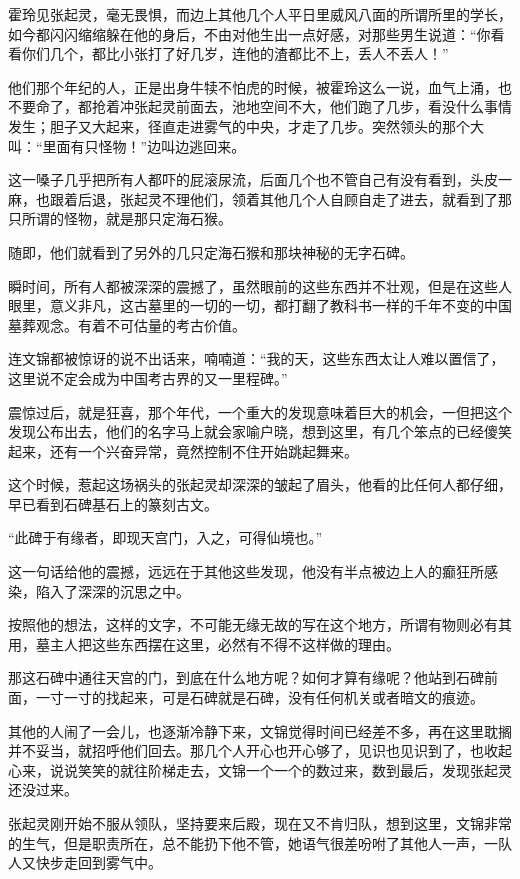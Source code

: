 霍玲见张起灵，毫无畏惧，而边上其他几个人平日里威风八面的所谓所里的学长，如今都闪闪缩缩躲在他的身后，不由对他生出一点好感，对那些男生说道：“你看看你们几个，都比小张打了好几岁，连他的渣都比不上，丢人不丢人！”

他们那个年纪的人，正是出身牛犊不怕虎的时候，被霍玲这么一说，血气上涌，也不要命了，都抢着冲张起灵前面去，池地空间不大，他们跑了几步，看没什么事情发生；胆子又大起来，径直走进雾气的中央，才走了几步。突然领头的那个大叫：“里面有只怪物！”边叫边逃回来。

这一嗓子几乎把所有人都吓的屁滚尿流，后面几个也不管自己有没有看到，头皮一麻，也跟着后退，张起灵不理他们，领着其他几个人自顾自走了进去，就看到了那只所谓的怪物，就是那只定海石猴。

随即，他们就看到了另外的几只定海石猴和那块神秘的无字石碑。

瞬时间，所有人都被深深的震撼了，虽然眼前的这些东西并不壮观，但是在这些人眼里，意义非凡，这古墓里的一切的一切，都打翻了教科书一样的千年不变的中国墓葬观念。有着不可估量的考古价值。

连文锦都被惊讶的说不出话来，喃喃道：“我的天，这些东西太让人难以置信了，这里说不定会成为中国考古界的又一里程碑。”

震惊过后，就是狂喜，那个年代，一个重大的发现意味着巨大的机会，一但把这个发现公布出去，他们的名字马上就会家喻户晓，想到这里，有几个笨点的已经傻笑起来，还有一个兴奋异常，竟然控制不住开始跳起舞来。

这个时候，惹起这场祸头的张起灵却深深的皱起了眉头，他看的比任何人都仔细，早已看到石碑基石上的篆刻古文。

“此碑于有缘者，即现天宫门，入之，可得仙境也。”

这一句话给他的震撼，远远在于其他这些发现，他没有半点被边上人的癫狂所感染，陷入了深深的沉思之中。

按照他的想法，这样的文字，不可能无缘无故的写在这个地方，所谓有物则必有其用，墓主人把这些东西摆在这里，必然有不得不这样做的理由。

那这石碑中通往天宫的门，到底在什么地方呢？如何才算有缘呢？他站到石碑前面，一寸一寸的找起来，可是石碑就是石碑，没有任何机关或者暗文的痕迹。

其他的人闹了一会儿，也逐渐冷静下来，文锦觉得时间已经差不多，再在这里耽搁并不妥当，就招呼他们回去。那几个人开心也开心够了，见识也见识到了，也收起心来，说说笑笑的就往阶梯走去，文锦一个一个的数过来，数到最后，发现张起灵还没过来。

张起灵刚开始不服从领队，坚持要来后殿，现在又不肯归队，想到这里，文锦非常的生气，但是职责所在，总不能扔下他不管，她语气很差吩咐了其他人一声，一队人又快步走回到雾气中。

